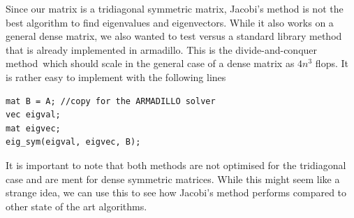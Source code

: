 \documentclass[a4paper,11pt]{article}
\begin{document}
{Since our matrix is a tridiagonal symmetric matrix, Jacobi's method is not the best algorithm to find eigenvalues and eigenvectors. While it also works on a general dense matrix, we also wanted to test versus a standard library method that is already implemented in armadillo. This is the divide-and-conquer method\ which should scale in the general case of a dense matrix as $4n^3$ flops\cite{Divide-and-conquer}. It is rather easy to implement with the following lines
\begin{lstlisting}
mat B = A; //copy for the ARMADILLO solver
vec eigval;
mat eigvec;
eig_sym(eigval, eigvec, B);
\end{lstlisting}
It is important to note that both methods are not optimised for the tridiagonal case and are ment for dense symmetric matrices. While this might seem like a strange idea, we can use this to see how Jacobi's method performs compared to other state of the art algorithms. 





}
\end{document}
